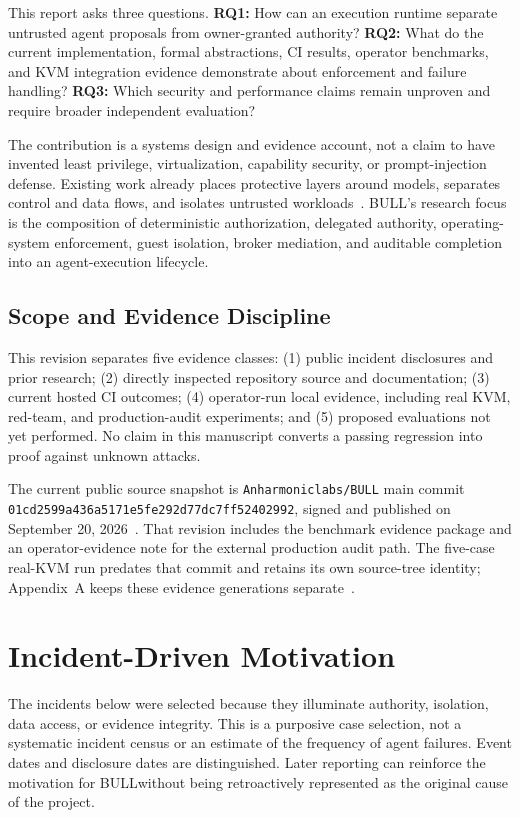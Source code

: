 \documentclass[journal]{IEEEtran}
\newcommand{\bull}{\textsc{BULL}}
\begin{document}
This report asks three questions. \textbf{RQ1:} How can an execution runtime separate untrusted agent proposals from owner-granted authority? \textbf{RQ2:} What do the current implementation, formal abstractions, CI results, operator benchmarks, and KVM integration evidence demonstrate about enforcement and failure handling? \textbf{RQ3:} Which security and performance claims remain unproven and require broader independent evaluation?

The contribution is a systems design and evidence account, not a claim to have invented least privilege, virtualization, capability security, or prompt-injection defense. Existing work already places protective layers around models, separates control and data flows, and isolates untrusted workloads~\cite{Debenedetti2025,gVisor,Agache2020}. \bull's research focus is the composition of deterministic authorization, delegated authority, operating-system enforcement, guest isolation, broker mediation, and auditable completion into an agent-execution lifecycle.

\subsection{Scope and Evidence Discipline}
This revision separates five evidence classes: (1) public incident disclosures and prior research; (2) directly inspected repository source and documentation; (3) current hosted CI outcomes; (4) operator-run local evidence, including real KVM, red-team, and production-audit experiments; and (5) proposed evaluations not yet performed. No claim in this manuscript converts a passing regression into proof against unknown attacks.

The current public source snapshot is \texttt{Anharmoniclabs/BULL} main commit \texttt{01cd2599a436a5171e5fe292d77dc7ff52402992}, signed and published on September 20, 2026~\cite{BULL_CurrentMain}. That revision includes the benchmark evidence package and an operator-evidence note for the external production audit path. The five-case real-KVM run predates that commit and retains its own source-tree identity; Appendix~A keeps these evidence generations separate~\cite{BULL_MicroVMReport,BULL_Benchmark,BULL_ExternalAudit}.

\section{Incident-Driven Motivation}
The incidents below were selected because they illuminate authority, isolation, data access, or evidence integrity. This is a purposive case selection, not a systematic incident census or an estimate of the frequency of agent failures. Event dates and disclosure dates are distinguished. Later reporting can reinforce the motivation for \bull without being retroactively represented as the original cause of the project.
\end{document}
